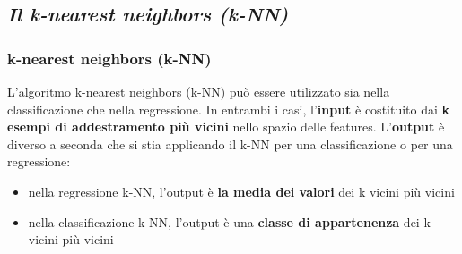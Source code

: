 \subsection[Il k-nearest neighbors (k-NN)]{\textit{Il k-nearest neighbors (k-NN)}}
\begin{frame}

	\frametitle{k-nearest neighbors (k-NN)}

		L'algoritmo k-nearest neighbors (k-NN) può essere utilizzato sia nella classificazione che nella regressione.
		\newlinedouble
		In entrambi i casi, l'\textbf{input} è costituito dai \textbf{k esempi di addestramento più vicini} nello spazio delle features.
		L'\textbf{output} è diverso a seconda che si stia applicando il k-NN per una classificazione o per una regressione:
		\begin{itemize}
			\item nella regressione k-NN, l'output è \textbf{la media dei valori} dei k vicini più vicini
			\item nella classificazione k-NN, l'output è una \textbf{classe di appartenenza} dei k vicini più vicini
		\end{itemize}


\end{frame}


